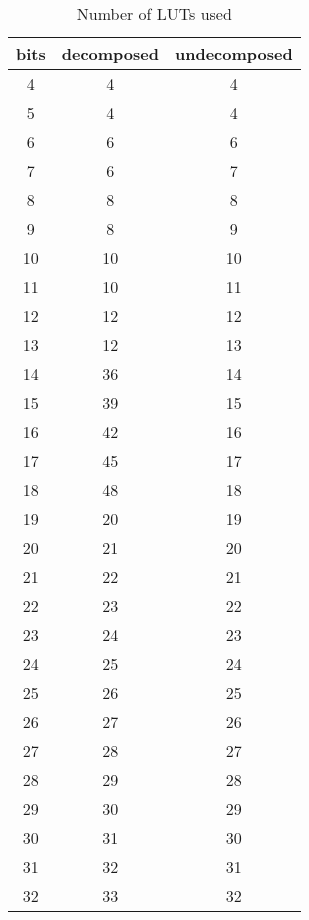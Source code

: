 \documentclass{article}
\begin{document}
\begin{table}[h]
\centering
\begin{tabular}{c | c | c }
bits	 & decomposed	 & undecomposed \\ 
\hline4	 & 4	 & 4 \\ 
5	 & 4	 & 4 \\ 
6	 & 6	 & 6 \\ 
7	 & 6	 & 7 \\ 
8	 & 8	 & 8 \\ 
9	 & 8	 & 9 \\ 
10	 & 10	 & 10 \\ 
11	 & 10	 & 11 \\ 
12	 & 12	 & 12 \\ 
13	 & 12	 & 13 \\ 
14	 & 36	 & 14 \\ 
15	 & 39	 & 15 \\ 
16	 & 42	 & 16 \\ 
17	 & 45	 & 17 \\ 
18	 & 48	 & 18 \\ 
19	 & 20	 & 19 \\ 
20	 & 21	 & 20 \\ 
21	 & 22	 & 21 \\ 
22	 & 23	 & 22 \\ 
23	 & 24	 & 23 \\ 
24	 & 25	 & 24 \\ 
25	 & 26	 & 25 \\ 
26	 & 27	 & 26 \\ 
27	 & 28	 & 27 \\ 
28	 & 29	 & 28 \\ 
29	 & 30	 & 29 \\ 
30	 & 31	 & 30 \\ 
31	 & 32	 & 31 \\ 
32	 & 33	 & 32 \\ 
\end{tabular}
\caption{Number of LUTs used}
\end{table}
\end{document}
